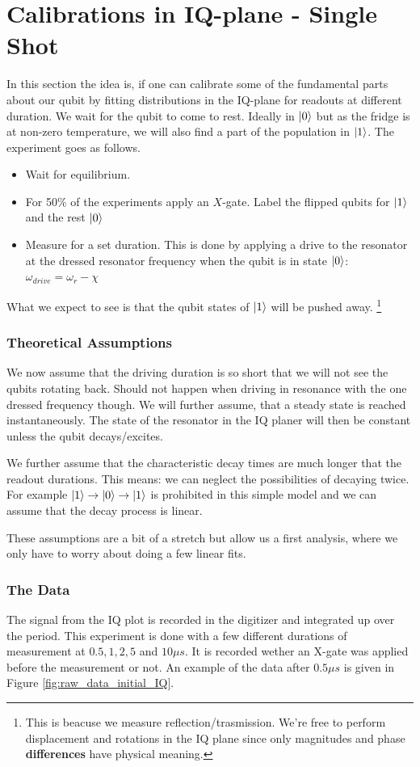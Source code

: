 \chapter{Calibrations in IQ-plane - Single Shot}
In this section the idea is, if one can calibrate some of the fundamental parts about our qubit by fitting distributions in the IQ-plane for readouts at different duration. We wait for the qubit to come to rest. Ideally in $\ket{0}$ but as the fridge is at non-zero temperature, we will also find a part of the population in $\ket{1}$. The experiment goes as follows.
\begin{itemize}
    \item Wait for equilibrium.
    \item For 50\% of the experiments apply an $X$-gate. Label the flipped qubits for $\ket{1}$ and the rest $\ket{0}$
    \item Measure for a set duration. This is done by applying a drive to the resonator at the dressed resonator frequency when the qubit is in state $\ket{0}$: $\omega_{drive} = \omega_r - \chi$
\end{itemize}
What we expect to see is that the qubit states of $\ket{1}$ will be pushed away. \footnote{This is beacuse we measure reflection/trasmission. We're free to perform displacement and rotations in the IQ plane since only magnitudes and phase \textbf{differences} have physical meaning.} 

\subsection{Theoretical Assumptions}
We now assume that the driving duration is so short that we will not see the qubits rotating back. Should not happen when driving in resonance with the one dressed frequency though. We will further assume, that a steady state is reached instantaneously. The state of the resonator in the IQ planer will then be constant unless the qubit decays/excites. 

We further assume that the characteristic decay times are much longer that the readout durations. This means: we can neglect the possibilities of decaying twice. For example $\ket{1} \to \ket{0} \to \ket{1}$ is prohibited in this simple model and we can assume that the decay process is linear.

These assumptions are a bit of a stretch but allow us a first analysis, where we only have to worry about doing a few linear fits.

\subsection{The Data}
The signal from the IQ plot is recorded in the digitizer and integrated up over the period. This experiment is done with a few different durations of measurement at $0.5, 1, 2, 5$ and $10 \mu s$. It is recorded wether an X-gate was applied before the measurement or not. An example of the data after $0.5 \mu s$ is given in Figure \ref{fig:raw_data_initial_IQ}.

